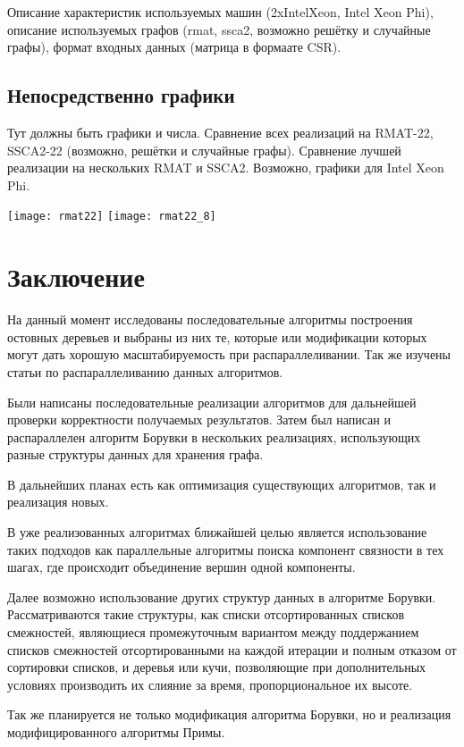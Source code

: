 \documentclass{article}
\begin{document}
Описание характеристик используемых машин (2xIntelXeon, Intel Xeon Phi), описание используемых графов (rmat, ssca2, возможно решётку и случайные графы), формат входных данных (матрица в формаате CSR).

\subsection{Непосредственно графики}

Тут должны быть графики и числа.
Сравнение всех реализаций на RMAT-22, SSCA2-22 (возможно, решётки и случайные графы).
Сравнение лучшей реализации на нескольких RMAT и SSCA2.
Возможно, графики для Intel Xeon Phi.

\texttt{[image: rmat22]}
\texttt{[image: rmat22\_8]}

\newpage
\section{Заключение}
На данный момент исследованы последовательные алгоритмы построения остовных деревьев и выбраны из них те, которые или модификации которых могут дать хорошую масштабируемость при распараллеливании. Так же изучены статьи  \cite{dense-mst,boruvka-prima,boruvka-cm5} по распараллеливанию данных алгоритмов.

Были написаны последовательные реализации алгоритмов для дальнейшей проверки корректности получаемых результатов. Затем был написан и распараллелен алгоритм Борувки в нескольких реализациях, использующих разные структуры данных для хранения графа.

В дальнейших планах есть как оптимизация существующих алгоритмов, так и реализация новых.

В уже реализованных алгоритмах ближайшей целью является использование таких подходов как параллельные алгоритмы поиска компонент связности в тех шагах, где происходит объединение вершин одной компоненты.

Далее возможно использование других  структур данных в алгоритме Борувки. Рассматриваются такие структуры, как списки отсортированных списков смежностей, являющиеся промежуточным вариантом между поддержанием списков смежностей отсортированными на каждой итерации и полным отказом от сортировки списков, и деревья или кучи, позволяющие при дополнительных условиях производить их слияние за время, пропорциональное их высоте.

Так же планируется не только модификация алгоритма Борувки, но и реализация модифицированного алгоритмы Примы.

\newpage


\end{document}
